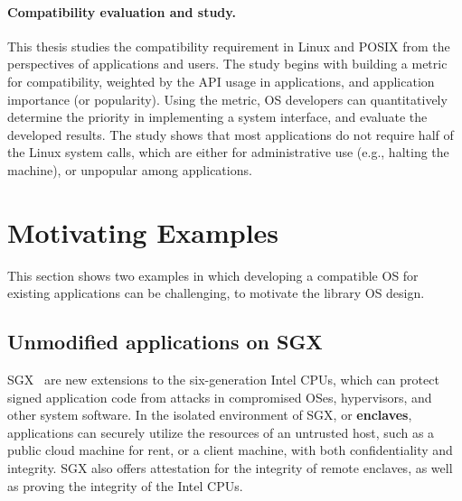 \paragraph{Compatibility evaluation and study.}
This thesis studies the compatibility requirement in Linux and POSIX
from the perspectives of applications and users.
The study begins with building a metric for compatibility,
weighted by the API usage in applications,
and application importance (or popularity).
Using the metric,
OS developers can quantitatively determine the priority in implementing a system interface,
and evaluate the developed results.
The study shows that most applications do not require
half of the Linux system calls,
which are either for administrative use (e.g., halting the machine), or unpopular among applications.



\section{Motivating Examples}

This section shows two examples in which developing a compatible OS for existing applications can be challenging, to motivate the library OS design.


\subsection{Unmodified applications on SGX}
\label{sec:intro:sgx}

SGX~\cite{intelsgx} are new extensions to the six-generation Intel CPUs,
which can
protect signed application code from attacks in compromised OSes, hypervisors, and other system software.
In the isolated environment of SGX, or {\bf enclaves}, applications can securely utilize the
resources of an untrusted host,
such as a public cloud machine for rent, or a client machine,
with both confidentiality and integrity.
SGX also offers attestation for the integrity of remote enclaves, as well as proving the integrity of the Intel CPUs.


